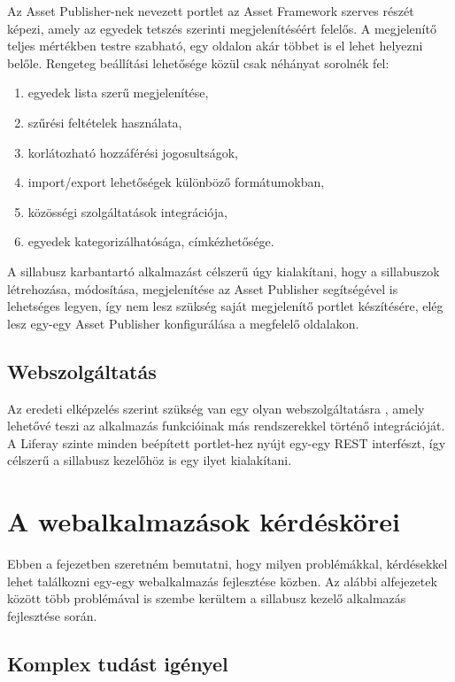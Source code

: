\documentclass[hidelinks, 12pt, a4paper]{report}
\begin{document}
Az Asset Publisher-nek nevezett portlet az Asset Framework szerves részét képezi, amely az egyedek tetszés szerinti megjelenítéséért felelős. A megjelenítő teljes mértékben testre szabható, egy oldalon akár többet is el lehet helyezni belőle. Rengeteg beállítási lehetősége közül csak néhányat sorolnék fel:
\begin{enumerate}
\item egyedek lista szerű megjelenítése,
\item szűrési feltételek használata,
\item korlátozható hozzáférési jogosultságok,
\item import/export lehetőségek különböző formátumokban,
\item közösségi szolgáltatások integrációja,
\item egyedek kategorizálhatósága, címkézhetősége.
\end{enumerate}

A sillabusz karbantartó alkalmazást célszerű úgy kialakítani, hogy a sillabuszok létrehozása, módosítása, megjelenítése az Asset Publisher segítségével is lehetséges legyen, így nem lesz szükség saját megjelenítő portlet készítésére, elég lesz egy-egy Asset Publisher konfigurálása a megfelelő oldalakon.

\section{Webszolgáltatás}

Az eredeti elképzelés szerint szükség van egy olyan webszolgáltatásra \cite{java-ee-platformon}, amely lehetővé teszi az alkalmazás funkcióinak más rendszerekkel történő integrációját. A Liferay szinte minden beépített portlet-hez nyújt egy-egy REST \cite{packt-restful} interfészt, így célszerű a sillabusz kezelőhöz is egy ilyet kialakítani.

\chapter{A webalkalmazások kérdéskörei}

Ebben a fejezetben szeretném bemutatni, hogy milyen problémákkal, kérdésekkel lehet találkozni egy-egy webalkalmazás fejlesztése közben. Az alábbi alfejezetek között több problémával is szembe kerültem a sillabusz kezelő alkalmazás fejlesztése során.

\section{Komplex tudást igényel}
\end{document}
